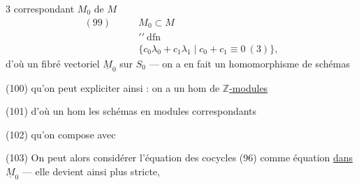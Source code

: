 
$3$ correspondant $M_0$ de $M$
\[
\begin{aligned}
(99)\qquad&M_0\subset M\\[-2pt]
&\prime\prime\ \mathrm{dfn}\\[-2pt]
&\{c_0\lambda_0+c_1\lambda_1\mid c_0+c_1\equiv0\ (3)\},
\end{aligned}
\]
d'où un fibré vectoriel $\underline M_0$ sur $S_0$ ---
on a en fait un homomorphisme de schémas

(100)
qu'on peut expliciter ainsi : on a un hom de \uline{$\mathbb Z$-modules}

(101)
d'où un hom  les schémas en modules correspondants

(102)
qu'on compose avec

(103)
On peut alors considérer l'équation des cocycles (96) comme équation \uline{dans}
$\underline M_0$ --- elle devient ainsi plus stricte,


